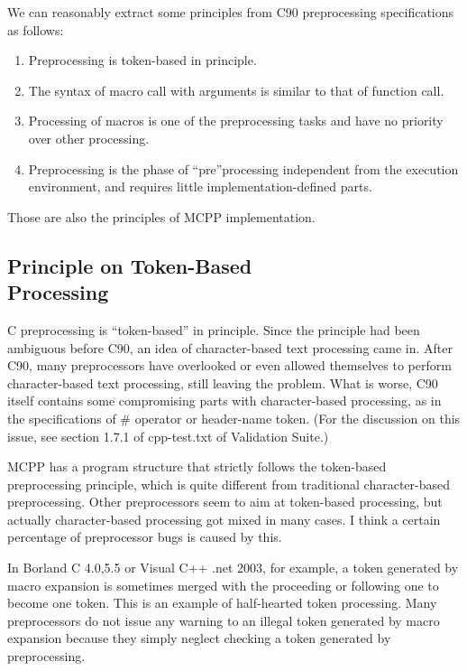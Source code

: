 \documentclass[twocolumn]{article}
\begin{document}
We can reasonably extract some principles from C90 preprocessing specifications as follows:

\begin{enumerate}
\item Preprocessing is token-based in principle.
\item The syntax of macro call with arguments is similar to that of function call.
\item Processing of macros is one of the preprocessing tasks and have no priority over other processing.
\item Preprocessing is the phase of ``pre''processing independent from the execution environment, and requires little implementation-defined parts.
\end{enumerate}

Those are also the principles of MCPP implementation.

\subsection{Principle on Token-Based \\
Processing}

C preprocessing is ``token-based'' in principle.  Since the principle had been ambiguous before C90, an idea of character-based text processing came in.  After C90, many preprocessors have overlooked or even allowed themselves to perform character-based text processing, still leaving the problem.  What is worse, C90 itself contains some compromising parts with character-based processing, as in the specifications of \# operator or header-name token.  (For the discussion on this issue, see section 1.7.1 of cpp-test.txt of Validation Suite.)

MCPP has a program structure that strictly follows the token-based preprocessing principle, which is quite different from traditional character-based preprocessing.  Other preprocessors seem to aim at token-based processing, but actually character-based processing got mixed in many cases.  I think a certain percentage of preprocessor bugs is caused by this.

In Borland C 4.0,5.5 or Visual C++ .net 2003, for example, a token generated by macro expansion is sometimes merged with the proceeding or following one to become one token.  This is an example of half-hearted token processing.  
Many preprocessors do not issue any warning to an illegal token generated by macro expansion because they simply neglect checking a token generated by preprocessing.
\end{document}
